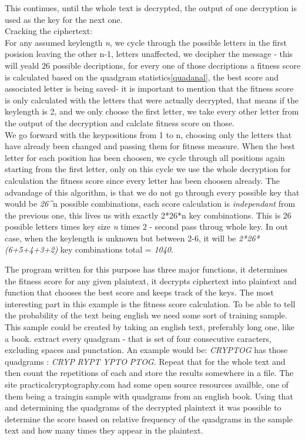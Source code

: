 \documentclass[12pt]{report}
\begin{document}
This continues, until the whole text is decrypted, the output of one decryption is used as the key for the next one.\\
Cracking the ciphertext:\\
For any assumed keylength \emph{n}, we cycle through the possible letters in the first posision leaving the other n-1, letters unaffected, we decipher the message - this will yeald 26 possible decriptions, for every one of those decriptions a fitness score is calculated based on the quadgram statistics\ref{quadanal}, the best score and associated letter is being saved- it is important to mention that the fitness score is only calculated with the letters that were actually decrypted, that means if the keylength is 2, and we only choose the first letter, we take every other letter from the output of the decryption and calclate fitness score on those.\\We go forward with the keypositions from 1 to n, choosing only the letters that have already been changed and passing them for fitness measure. When the best letter for each position has been choosen, we cycle through all positions again starting from the first letter, only on this cycle we use the whole decryption for calculation the fitness score since every letter has been choosen already. The advandage of this algorithm, is that we do not go through every possible key that would be \emph{26\^}n possible combinations, each score calculation is \emph{independant} from the previous one, this lives us with exactly 2*26*n key combinations. This is 26 possible letters times key size \emph{n} times 2 - second pass throug whole key. In out case, when the keylength is unknown but between 2-6, it will be  \emph{2*26*(6+5+4+3+2)} key combinations total = \emph{1040}.

The program written for this purpose has three major functions, it determines the fitness score for any given plaintext, it decrypts ciphertext into plaintext and function that chooses the best score and keeps track of the keys. The most interesting part in this example is the fitness score calculation. To be able to tell the probability of the text being english we need some sort of training sample. This sample could be created by taking an english text, preferably long one, like a book. extract every quadgram - that is set of four consecutive caracters, excluding spaces and punctation. An example would be: \emph{CRYPTOG} has those quadgrams : \emph{CRYP} \emph{RYPT} \emph{YPTO} \emph{PTOG}. Repeat that for the whole text and then count the repetitions of each and store the results somewhere in a file. The site practicalcryptography.com\cite{quadanal} had some open source resources availble, one of them being a traingin sample with quadgrams from an english book. Using that and determining the quadgrams of the decrypted plaintext it was possible to determine the score based on relative frequency of the quadgrams in the sample text and how many times they appear in the plaintext.
\end{document}
